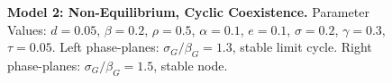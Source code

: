 \documentclass{amsart}
\theoremstyle{definition}
\theoremstyle{remark}
\numberwithin{equation}{section}
\begin{document}
\begin{centering}
\begin{figure}[h]
{			%
		}
		\caption{\footnotesize {\bf Model 2: Non-Equilibrium, Cyclic Coexistence.} Parameter Values: $d = 0.05$, $\beta = 0.2$, $\rho = 0.5$, $\alpha = 0.1$, $e = 0.1$, $\sigma = 0.2$, $\gamma = 0.3$, $\tau = 0.05$.  Left phase-planes: $\sigma_G/\beta_G = 1.3$, stable limit cycle.  Right phase-planes: $\sigma_G/\beta_G = 1.5$, stable node.}
		\label{fig:hopf_bifurcation}
	\end{figure}
\end{centering}
\end{document}
